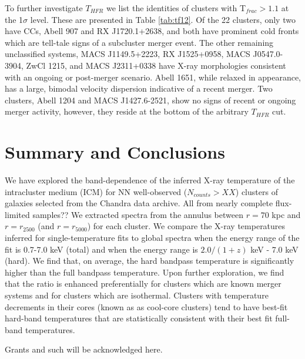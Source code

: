 \documentclass{emulateapj}
\newcommand{\tf}{T_{HFR} }
\begin{document}
{To further investigate  $\tf$ we list the identities of 
clusters with T$_{frac} > 1.1$ at the 1$\sigma$ level. These are
presented in Table \ref{tab:tf12}. Of the 22 clusters, only two have
CCs, Abell 907 and RX J1720.1+2638, and both have prominent cold fronts which are tell-tale
signs of a subcluster merger event. The other remaining unclassified
systems, MACS J1149.5+2223, RX J1525+0958, MACS J0547.0-3904, ZwCl
1215, and MACS J2311+0338 have X-ray morphologies consistent with an
ongoing or post-merger scenario. Abell 1651, while relaxed in
appearance, has a large, bimodal velocity dispersion indicative of a
recent merger. Two clusters, Abell 1204 and MACS J1427.6-2521, show no
signs of recent or ongoing merger activity, however, they reside at the
bottom of the arbitrary $\tf$ cut.

\section{Summary and Conclusions}\label{sec:summary}

We have explored the band-dependence of the inferred X-ray temperature of the intracluster
medium (ICM) for NN well-observed ($N_{counts} > XX$) 
clusters of galaxies selected from the Chandra data archive. 
All from nearly complete flux-limited samples??
We extracted
spectra from the annulus between $r=70$ kpc and $r=r_{2500}$ (and $r=r_{5000}$)  
for each cluster. We
compare the X-ray temperatures inferred for single-temperature fits to global spectra when
the energy range of the fit is 0.7-7.0 keV (total) and when the energy range is $2.0/(1+z)$ keV - 
7.0 keV (hard). We find that, on average, the hard bandpass temperature is significantly higher than
the full bandpass temperature. Upon further exploration, we find that the ratio is enhanced preferentially
for clusters which are known merger systems and for clusters which are isothermal. Clusters with
temperature decrements in their cores (known as as cool-core clusters) 
tend to have best-fit hard-band temperatures that are statistically
consistent with their best fit full-band temperatures.

\acknowledgements
Grants and such will be acknowledged here.




}
\end{document}

